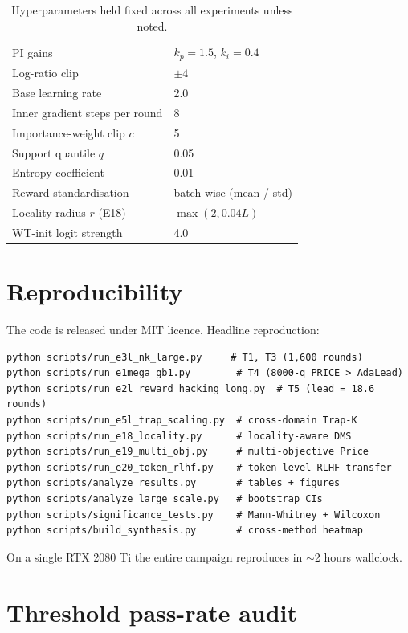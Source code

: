 \begin{table}[h]
\centering
\caption{Hyperparameters held fixed across all experiments unless noted.}
\begin{tabular}{ll}
\toprule
PI gains & $k_p = 1.5$, $k_i = 0.4$ \\
Log-ratio clip & $\pm 4$ \\
Base learning rate & 2.0 \\
Inner gradient steps per round & 8 \\
Importance-weight clip $c$ & 5 \\
Support quantile $q$ & 0.05 \\
Entropy coefficient & 0.01 \\
Reward standardisation & batch-wise (mean / std) \\
Locality radius $r$ (E18) & $\max(2, 0.04 L)$ \\
WT-init logit strength & 4.0 \\
\bottomrule
\end{tabular}
\end{table}

\section{Reproducibility}
\label{app:reproducibility}

The code is released under MIT licence. Headline reproduction:
\begin{verbatim}
python scripts/run_e3l_nk_large.py     # T1, T3 (1,600 rounds)
python scripts/run_e1mega_gb1.py        # T4 (8000-q PRICE > AdaLead)
python scripts/run_e2l_reward_hacking_long.py  # T5 (lead = 18.6 rounds)
python scripts/run_e5l_trap_scaling.py  # cross-domain Trap-K
python scripts/run_e18_locality.py      # locality-aware DMS
python scripts/run_e19_multi_obj.py     # multi-objective Price
python scripts/run_e20_token_rlhf.py    # token-level RLHF transfer
python scripts/analyze_results.py       # tables + figures
python scripts/analyze_large_scale.py   # bootstrap CIs
python scripts/significance_tests.py    # Mann-Whitney + Wilcoxon
python scripts/build_synthesis.py       # cross-method heatmap
\end{verbatim}
On a single RTX 2080 Ti the entire campaign reproduces in $\sim$2 hours wallclock.

\section{Threshold pass-rate audit}
\label{app:audit}

